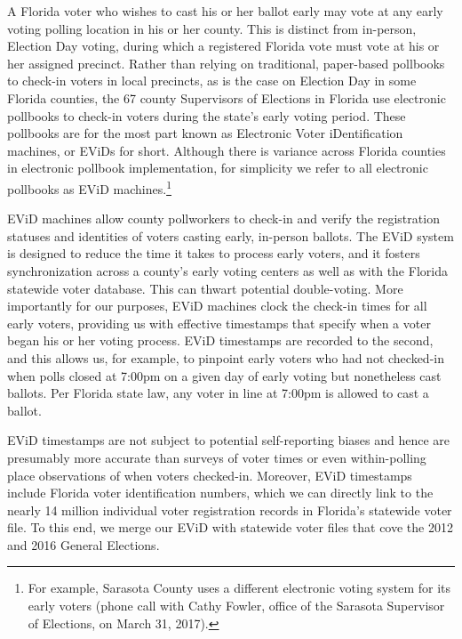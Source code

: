 \documentclass[12pt,titlepage]{article}
\begin{document}
A Florida voter who wishes to cast his or her ballot early may vote at
any early voting polling location in his or her county.  This is
distinct from in-person, Election Day voting, during which a
registered Florida vote must vote at his or her assigned precinct.
Rather than relying on traditional, paper-based pollbooks to check-in
voters in local precincts, as is the case on Election Day in some
Florida counties, the 67 county Supervisors of Elections in Florida
use electronic pollbooks to check-in voters during the state's early
voting period.  These pollbooks are for the most part known as
Electronic Voter iDentification machines, or EViDs for short.
Although there is variance across Florida counties in electronic
pollbook implementation, for simplicity we refer to all electronic
pollbooks as EViD machines.\footnote{For example, Sarasota County uses
  a different electronic voting system for its early voters (phone
  call with Cathy Fowler, office of the Sarasota Supervisor of
  Elections, on March 31, 2017).}


EViD machines allow county pollworkers to check-in and verify the
registration statuses and identities of voters casting early,
in-person ballots. The EViD system is designed to reduce the time it
takes to process early voters, and it fosters synchronization across a
county's early voting centers as well as with the Florida statewide
voter database.  This can thwart potential double-voting.  More
importantly for our purposes, EViD machines clock the check-in times
for all early voters, providing us with effective timestamps that
specify when a voter began his or her voting process. EViD timestamps
are recorded to the second, and this allows us, for example, to
pinpoint early voters who had not checked-in when polls closed at
7:00pm on a given day of early voting but nonetheless cast ballots.
Per Florida state law, any voter in line at 7:00pm is allowed to cast
a ballot.

EViD timestamps are not subject to potential self-reporting biases and
hence are presumably more accurate than surveys of voter times or even
within-polling place observations of when voters checked-in.
Moreover, EViD timestamps include Florida voter identification
numbers, which we can directly link to the nearly 14 million
individual voter registration records in Florida's statewide voter
file.  To this end, we merge our EViD with statewide voter files that
cove the 2012 and 2016 General Elections.  %
\end{document}

